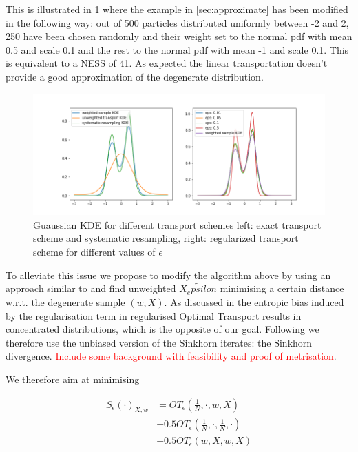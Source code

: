 \documentclass[%
reprint,
amsmath,amssymb,
aps,
]{revtex4-2}
\newcommand\todo[1]{\textcolor{red}{#1}}
\begin{document}
		This is illustrated in \cref{fig:degenerate_map} where the example in \cref{sec:approximate} has been modified in the following way: out of 500 particles distributed uniformly between -2 and 2, 250 have been chosen randomly and their weight set to the normal pdf with mean 0.5 and scale 0.1 and the rest to the normal pdf with mean -1 and scale 0.1. This is equivalent to a NESS of 41. As expected the linear transportation doesn't provide a good approximation of the degenerate distribution.
		
		\begin{figure}
			\includegraphics[width=\linewidth]{DegenerateTransport}
			\caption{
				Guaussian KDE for different transport schemes
				left: exact transport scheme and systematic resampling, right: regularized transport scheme for different values of $\epsilon$}
			\label{fig:degenerate_map}
		\end{figure}	
		
		To alleviate this issue we propose to modify the algorithm above by using an approach similar to \cite{genevay2017learning} and find unweighted $\tilde{X_epsilon}$ minimising a certain distance w.r.t. the degenerate sample $(w, X)$. As discussed in \cite{feydy:interpolating} the entropic bias induced by the regularisation term in regularised Optimal Transport results in concentrated distributions, which is the opposite of our goal. Following \cite{genevay2017learning} we therefore use the unbiased version of the Sinkhorn iterates: the Sinkhorn divergence. \todo{Include some background with feasibility \cite{feydy:interpolating} and proof of metrisation}.
		
		We therefore aim at minimising 
		
		\begin{align*} 
			S_\epsilon(\cdot)_{X, w} 
				&= OT_{\epsilon}\left(\frac 1 N, \cdot, w, X\right) \\
				&- 0.5 OT_\epsilon\left(\frac 1 N, \cdot, \frac 1 N, \cdot \right) \\ 
				&- 0.5 OT_\epsilon(w, X, w, X)
		\end{align*}
		
\end{document}
